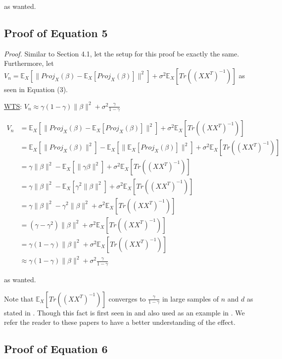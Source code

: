 \documentclass{article}
\begin{document}
as wanted.

\subsection{Proof of Equation 5}

\emph{Proof.}
Similar to Section 4.1, let the setup for this proof be exactly the same. Furthermore, let $V_n =  \mathbb{E}_X [\|Proj_{X} (\beta) - \mathbb{E}_X [Proj_X (\beta)]\|^2] + \sigma^2 \mathbb{E}_X [Tr((XX^T)^{-1})]$ as seen in Equation (3).

\underline{WTS}: $V_n \approx \gamma(1-\gamma) \|\beta\|^2 + \sigma^2 \frac{\gamma}{1-\gamma}$

\begin{align*}
    V_n &= \mathbb{E}_X [\|Proj_{X} (\beta) - \mathbb{E}_X [Proj_X (\beta)]\|^2] + \sigma^2 \mathbb{E}_X [Tr((XX^T)^{-1})]\\
    &= \mathbb{E}_X [\|Proj_X (\beta)\|^2] - \mathbb{E}_X [\| \mathbb{E}_X [Proj_X (\beta)]\|^2] + \sigma^2 \mathbb{E}_X [Tr((XX^T)^{-1})]\\
    &= \gamma\|\beta\|^2 - \mathbb{E}_X [\|\gamma\beta\|^2] + \sigma^2 \mathbb{E}_X [Tr((XX^T)^{-1})]\\
    &= \gamma\|\beta\|^2 - \mathbb{E}_X [\gamma^2 \|\beta\|^2] + \sigma^2 \mathbb{E}_X [Tr((XX^T)^{-1})]\\
    &= \gamma\|\beta\|^2 - \gamma^2\|\beta\|^2 + \sigma^2 \mathbb{E}_X [Tr((XX^T)^{-1})]\\
    &= (\gamma - \gamma^2) \|\beta\|^2 + \sigma^2 \mathbb{E}_X [Tr((XX^T)^{-1})]\\
    &= \gamma(1-\gamma) \|\beta\|^2 + \sigma^2 \mathbb{E}_X [Tr((XX^T)^{-1})]\\
    &\approx \gamma(1-\gamma) \|\beta\|^2 + \sigma^2 \frac{\gamma}{1-\gamma}
\end{align*}

as wanted.

Note that $\mathbb{E}_X [Tr((XX^T)^{-1})]$ converges to $ \frac{\gamma}{1-\gamma}$ in large samples of $n$ and $d$ as stated in \cite{Nakkiran_2019}. Though this fact is first seen in \cite{Marčenko_1967} and also used as an example in \cite{Hastie_2022}. We refer the reader to these papers to have a better understanding of the effect.

\subsection{Proof of Equation 6}
\end{document}
